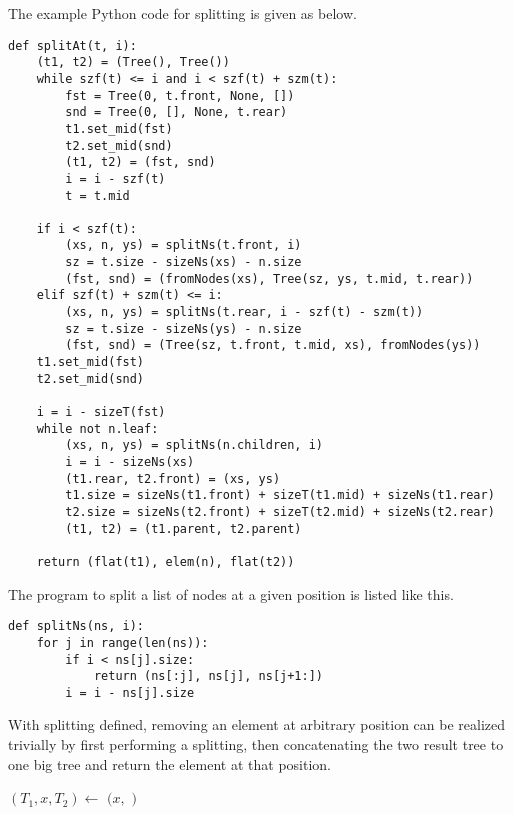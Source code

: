 \documentclass[UTF8]{article}
\begin{document}
The example Python code for splitting is given as below.

\lstset{language=Python}
\begin{lstlisting}
def splitAt(t, i):
    (t1, t2) = (Tree(), Tree())
    while szf(t) <= i and i < szf(t) + szm(t):
        fst = Tree(0, t.front, None, [])
        snd = Tree(0, [], None, t.rear)
        t1.set_mid(fst)
        t2.set_mid(snd)
        (t1, t2) = (fst, snd)
        i = i - szf(t)
        t = t.mid

    if i < szf(t):
        (xs, n, ys) = splitNs(t.front, i)
        sz = t.size - sizeNs(xs) - n.size
        (fst, snd) = (fromNodes(xs), Tree(sz, ys, t.mid, t.rear))
    elif szf(t) + szm(t) <= i:
        (xs, n, ys) = splitNs(t.rear, i - szf(t) - szm(t))
        sz = t.size - sizeNs(ys) - n.size
        (fst, snd) = (Tree(sz, t.front, t.mid, xs), fromNodes(ys))
    t1.set_mid(fst)
    t2.set_mid(snd)

    i = i - sizeT(fst)
    while not n.leaf:
        (xs, n, ys) = splitNs(n.children, i)
        i = i - sizeNs(xs)
        (t1.rear, t2.front) = (xs, ys)
        t1.size = sizeNs(t1.front) + sizeT(t1.mid) + sizeNs(t1.rear)
        t2.size = sizeNs(t2.front) + sizeT(t2.mid) + sizeNs(t2.rear)
        (t1, t2) = (t1.parent, t2.parent)

    return (flat(t1), elem(n), flat(t2))
\end{lstlisting}

The program to split a list of nodes at a given position is listed like this.

\begin{lstlisting}
def splitNs(ns, i):
    for j in range(len(ns)):
        if i < ns[j].size:
            return (ns[:j], ns[j], ns[j+1:])
        i = i - ns[j].size
\end{lstlisting}

With splitting defined, removing an element at arbitrary position can be realized trivially
by first performing a splitting, then concatenating the two result tree to one big tree and return
the element at that position.

\begin{algorithmic}
  \State $(T_1, x, T_2) \gets$ 
  \State \Return $(x, $  $)$
\EndFunction
\end{algorithmic}
\end{document}
